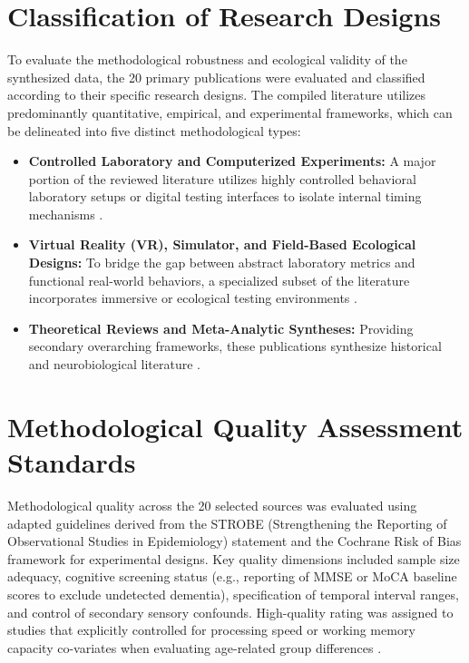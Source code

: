 \documentclass{custom_report}
\begin{document}
\section{Classification of Research Designs}
To evaluate the methodological robustness and ecological validity of the synthesized data, the 20 primary publications were evaluated and classified according to their specific research designs. The compiled literature utilizes predominantly quantitative, empirical, and experimental frameworks, which can be delineated into five distinct methodological types:

\begin{itemize}
    \item \textbf{Controlled Laboratory and Computerized Experiments:} A major portion of the reviewed literature utilizes highly controlled behavioral laboratory setups or digital testing interfaces to isolate internal timing mechanisms \cite{Baudouin2019, Craik1999, Lustig2001}.
    \item \textbf{Virtual Reality (VR), Simulator, and Field-Based Ecological Designs:} To bridge the gap between abstract laboratory metrics and functional real-world behaviors, a specialized subset of the literature incorporates immersive or ecological testing environments \cite{Carrigan2026, Zivotofsky2012}.
    \item \textbf{Theoretical Reviews and Meta-Analytic Syntheses:} Providing secondary overarching frameworks, these publications synthesize historical and neurobiological literature \cite{Block1998, Turgeon2016}.
\end{itemize}

\section{Methodological Quality Assessment Standards}
Methodological quality across the 20 selected sources was evaluated using adapted guidelines derived from the STROBE (Strengthening the Reporting of Observational Studies in Epidemiology) statement and the Cochrane Risk of Bias framework for experimental designs. Key quality dimensions included sample size adequacy, cognitive screening status (e.g., reporting of MMSE or MoCA baseline scores to exclude undetected dementia), specification of temporal interval ranges, and control of secondary sensory confounds. High-quality rating was assigned to studies that explicitly controlled for processing speed or working memory capacity co-variates when evaluating age-related group differences \cite{Baudouin2019, Capizzi2022}.
\end{document}
